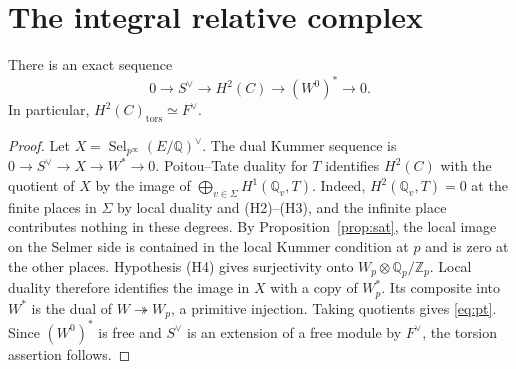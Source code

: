 \documentclass[11pt,a4paper]{article}
\newcommand{\Zp}{\mathbb Z_p}\newcommand{\Qp}{\mathbb Q_p}\newcommand{\Q}{\mathbb Q}\newcommand{\Sha}{\mathop{\mathrm{\mathit{\mathstrut Ш}}}} %
\renewcommand{\Sha}{\operatorname{Sha}}
\newcommand{\Sel}{\operatorname{Sel}}\newcommand{\rk}{\operatorname{rank}}\newcommand{\len}{\operatorname{length}}\newcommand{\coker}{\operatorname{coker}}\newcommand{\im}{\operatorname{im}}\newcommand{\Div}{\operatorname{Div}}\newcommand{\Ext}{\operatorname{Ext}}\newcommand{\Ann}{\operatorname{Ann}}\newcommand{\Tr}{\operatorname{tr}}\newcommand{\Fib}{\operatorname{Fib}}\newcommand{\Cone}{\operatorname{Cone}}
\begin{document}
\section{The integral relative complex}
\begin{proposition}\label{prop:pt}
There is an exact sequence
\begin{equation}\label{eq:pt}
0\longrightarrow S^\vee\longrightarrow H^2(C)\longrightarrow (W^0)^*\longrightarrow0.
\end{equation}
In particular, $H^2(C)_{\mathrm{tors}}\simeq F^\vee$.
\end{proposition}
\begin{proof}
Let $X=\Sel_{p^\infty}(E/\Q)^\vee$. The dual Kummer sequence is $0\to S^\vee\to X\to W^*\to0$. Poitou--Tate duality for $T$ identifies $H^2(C)$ with the quotient of $X$ by the image of $\bigoplus_{v\in\Sigma}H^1(\Q_v,T)$. Indeed, $H^2(\Q_v,T)=0$ at the finite places in $\Sigma$ by local duality and (H2)--(H3), and the infinite place contributes nothing in these degrees. By Proposition~\ref{prop:sat}, the local image on the Selmer side is contained in the local Kummer condition at $p$ and is zero at the other places. Hypothesis (H4) gives surjectivity onto $W_p\otimes\Qp/\Zp$. Local duality therefore identifies the image in $X$ with a copy of $W_p^*$. Its composite into $W^*$ is the dual of $W\twoheadrightarrow W_p$, a primitive injection. Taking quotients gives \eqref{eq:pt}. Since $(W^0)^*$ is free and $S^\vee$ is an extension of a free module by $F^\vee$, the torsion assertion follows.
\end{proof}
\end{document}
